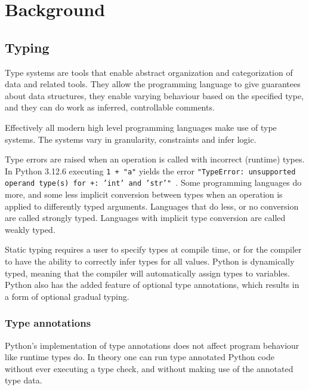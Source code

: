 \chapter{Background\label{background}}


\section{Typing}

Type systems are tools that enable abstract organization and categorization of data and related tools\cite{programming_langs}. They allow the programming language to give guarantees about data structures, they enable varying behaviour based on the specified type, and they can do work as inferred, controllable comments.

Effectively all modern high level programming languages make use of type systems. The systems vary in granularity, constraints and infer logic. 

Type errors are raised when an operation is called with incorrect (runtime) types. In Python 3.12.6 executing {\tt 1 + "a"} yields the error {\tt "TypeError: unsupported operand type(s) for +: 'int' and 'str'" }. Some programming languages do more, and some less implicit conversion between types when an operation is applied to differently typed arguments. Languages that do less, or no conversion are called strongly typed. Languages with implicit type conversion are called weakly typed. %

Static typing requires a user to specify types at compile time, or for the compiler to have the ability to correctly infer types for all values. Python is dynamically typed, meaning that the compiler will automatically assign types to variables. Python also has the added feature of optional type annotations, which results in a form of optional gradual typing.

\subsection{Type annotations}
Python's implementation of type annotations does not affect program behaviour like runtime types do. In theory one can run type annotated Python code without ever executing a type check, and without making use of the annotated type data.

